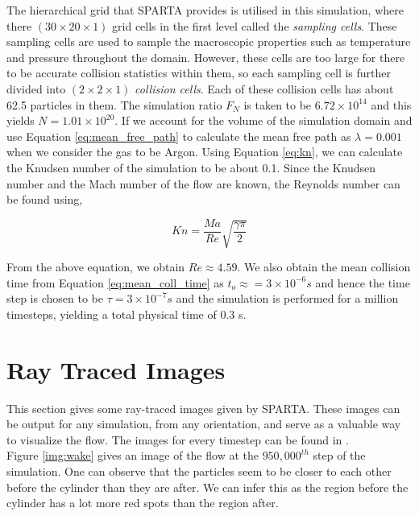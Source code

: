 \no The hierarchical grid that SPARTA provides is utilised in this simulation, where there 	$(30 \times 20 \times 1)$ grid cells in the first level called the \textit{sampling cells}. These sampling cells are used to sample the macroscopic properties such as temperature and pressure throughout the domain. However, these cells are too large for there to be accurate collision statistics within them, so each sampling cell is further divided into $(2 \times 2 \times 1)$ \textit{collision cells}. Each of these collision cells has about 62.5 particles in them. The simulation ratio $F_N$ is taken to be $6.72 \times 10 ^{14}$ and this yields $N = 1.01 \times 10^{20}$. If we account for the volume of the simulation domain and use Equation \ref{eq:mean_free_path} to calculate the mean free path as $\lambda = 0.001$ when we consider the gas to be Argon. Using Equation \ref{eq:kn}, we can calculate the Knudsen number of the simulation to be about 0.1. Since the Knudsen number and the Mach number of the flow are known, the Reynolds number can be found using,

\begin{equation}
	Kn = \frac{Ma}{Re} \sqrt{\frac{\gamma \pi}{2}}
\end{equation}

\no From the above equation, we obtain $Re \approx 4.59$. We also obtain the mean collision time from Equation \ref{eq:mean_coll_time} as $t_o \approx = 3 \times 10 ^ {-6} s$ and hence the time step is chosen to be $\tau = 3 \times 10 ^ {-7} s$ and the simulation is performed for a million timesteps, yielding a total physical time of 0.3 s.

\section{Ray Traced Images}

This section gives some ray-traced images given by SPARTA. These images can be output for any simulation, from any orientation, and serve as a valuable way to visualize the flow. The images for every timestep can be found in \cite{Raghuveeran_Work_During_Summer_2024}. \\

\no Figure \ref{img:wake} gives an image of the flow at the $950,000^{th}$ step of the simulation. One can observe that the particles seem to be closer to each other before the cylinder than they are after. We can infer this as the region before the cylinder has a lot more red spots than the region after.

